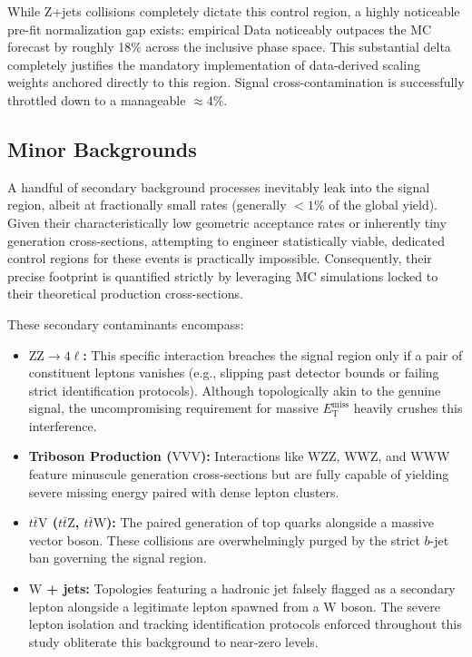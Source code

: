 While $\text{Z}$+jets collisions completely dictate this control region, a highly noticeable pre-fit normalization gap exists: empirical Data noticeably outpaces the MC forecast by roughly 18\% across the inclusive phase space. This substantial delta completely justifies the mandatory implementation of data-derived scaling weights anchored directly to this region. Signal cross-contamination is successfully throttled down to a manageable $\approx 4\%$.



\subsection{Minor Backgrounds}
\label{sec:bkg_minor}

A handful of secondary background processes inevitably leak into the signal region, albeit at fractionally small rates (generally $< 1\%$ of the global yield). Given their characteristically low geometric acceptance rates or inherently tiny generation cross-sections, attempting to engineer statistically viable, dedicated control regions for these events is practically impossible. Consequently, their precise footprint is quantified strictly by leveraging MC simulations locked to their theoretical production cross-sections.

These secondary contaminants encompass:

\begin{itemize}
    \item \textbf{$\text{ZZ} \to 4\ell$:} This specific interaction breaches the signal region only if a pair of constituent leptons vanishes (e.g., slipping past detector bounds or failing strict identification protocols). Although topologically akin to the genuine signal, the uncompromising requirement for massive $E_{\text{T}}^{\text{miss}}$ heavily crushes this interference.
    
    \item \textbf{Triboson Production ($\text{VVV}$):} Interactions like $\text{WZZ}$, $\text{WWZ}$, and $\text{WWW}$ feature minuscule generation cross-sections but are fully capable of yielding severe missing energy paired with dense lepton clusters.
    
    \item \textbf{$t\bar{t}\text{V}$ ($t\bar{t}\text{Z}$, $t\bar{t}\text{W}$):} The paired generation of top quarks alongside a massive vector boson. These collisions are overwhelmingly purged by the strict $b$-jet ban governing the signal region.
    
    \item \textbf{$\text{W}$ + jets:} Topologies featuring a hadronic jet falsely flagged as a secondary lepton alongside a legitimate lepton spawned from a $\text{W}$ boson. The severe lepton isolation and tracking identification protocols enforced throughout this study obliterate this background to near-zero levels.
\end{itemize}

